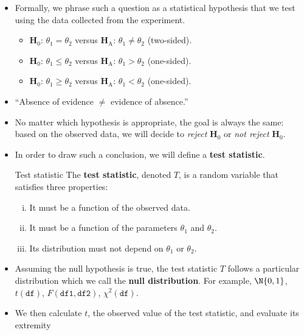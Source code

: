 \begin{itemize}
\begin{itemize}
          \end{itemize}
    \item Formally, we phrase such a question as a statistical hypothesis that we test using
          the data collected from the experiment.
          \begin{itemize}
              \item $ \mathbf{H}_0 $: $ \theta_1=\theta_2 $ versus $ \mathbf{H}_\text{A} $: $ \theta_1\ne\theta_2 $ (two-sided).
              \item $ \mathbf{H}_0 $: $ \theta_1\le\theta_2 $ versus $ \mathbf{H}_\text{A} $: $ \theta_1>\theta_2 $ (one-sided).
              \item $ \mathbf{H}_0 $: $ \theta_1\ge\theta_2 $ versus $ \mathbf{H}_\text{A} $: $ \theta_1<\theta_2 $ (one-sided).
          \end{itemize}
    \item ``Absence of evidence $ \ne  $ evidence of absence.''
    \item No matter which hypothesis is appropriate, the goal is always the same: based on the
          observed data, we will decide to \emph{reject} $ \mathbf{H}_0 $ or \emph{not reject} $ \mathbf{H}_0 $.
    \item In order to draw such a conclusion, we will define a \textbf{test statistic}.
          \begin{Definition}{Test statistic}{}
              The \textbf{test statistic}, denoted $ T $,
              is a random variable that satisfies three properties:
              \begin{enumerate}[(i)]
                  \item It must be a function of the observed data.
                  \item It must be a function of the parameters $ \theta_1 $ and $ \theta_2 $.
                  \item Its distribution must not depend on $ \theta_1 $ or $ \theta_2 $.
              \end{enumerate}
          \end{Definition}
    \item Assuming the null hypothesis is true, the test statistic $ T $ follows
          a particular distribution which we call the \textbf{null distribution}.
          For example, $ \N{0,1} $, $ t(\texttt{df}) $,
          $ F(\texttt{df1}, \texttt{df2}) $, $ \chi^2(\texttt{df}) $.
    \item We then calculate $ t $, the observed value of the test statistic, and evaluate its extremity

\end{itemize}

